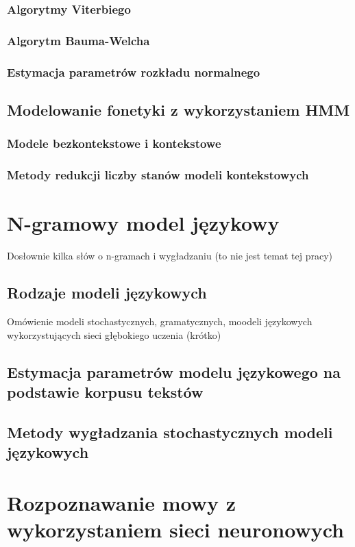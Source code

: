 \documentclass[11pt]{article}
\begin{document}
	   \subsubsection{Algorytmy Viterbiego}
	   \subsubsection{Algorytm Bauma-Welcha}
	   \subsubsection{Estymacja parametrów rozkładu normalnego}
	
    \subsection{Modelowanie fonetyki z wykorzystaniem HMM }
       \subsubsection{ Modele bezkontekstowe i kontekstowe}
       \subsubsection{ Metody redukcji liczby stanów modeli kontekstowych }	

\section{N-gramowy model językowy}
Dosłownie kilka słów o n-gramach i wygładzaniu (to nie jest temat tej pracy)
    \subsection{ Rodzaje modeli językowych }
      Omówienie modeli stochastycznych, gramatycznych, moodeli językowych wykorzystujących sieci głębokiego uczenia (krótko)
    \subsection{ Estymacja parametrów modelu językowego na podstawie korpusu tekstów }
    \subsection{ Metody wygładzania stochastycznych modeli językowych }


\section{Rozpoznawanie mowy z wykorzystaniem sieci neuronowych}
\end{document}
